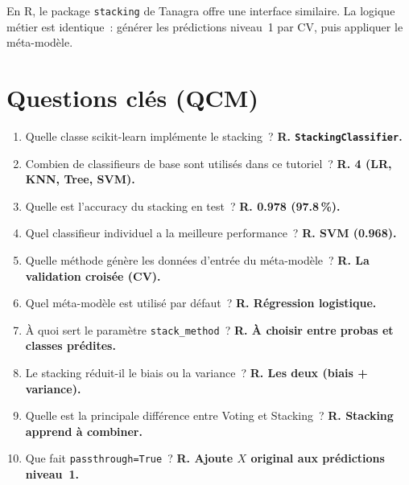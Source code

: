 \documentclass[a4paper,11pt]{article}
\begin{document}
\noindent En R, le package \texttt{stacking} de Tanagra offre une
interface similaire. La logique m\'etier est identique~: g\'en\'erer
les pr\'edictions niveau~1 par CV, puis appliquer le m\'eta-mod\`ele.

\newpage
\section*{Questions cl\'es (QCM)}

\begin{enumerate}
  \item Quelle classe scikit-learn impl\'emente le stacking~?
    \textbf{R. \texttt{StackingClassifier}.}
  \item Combien de classifieurs de base sont utilis\'es dans ce
    tutoriel~? \textbf{R. 4 (LR, KNN, Tree, SVM).}
  \item Quelle est l'accuracy du stacking en test~?
    \textbf{R. 0.978 (97.8\,\%).}
  \item Quel classifieur individuel a la meilleure performance~?
    \textbf{R. SVM (0.968).}
  \item Quelle m\'ethode g\'en\`ere les donn\'ees d'entr\'ee du
    m\'eta-mod\`ele~? \textbf{R. La validation crois\'ee (CV).}
  \item Quel m\'eta-mod\`ele est utilis\'e par d\'efaut~?
    \textbf{R. R\'egression logistique.}
  \item \`A quoi sert le param\`etre \texttt{stack\_method}~?
    \textbf{R. \`A choisir entre probas et classes pr\'edites.}
  \item Le stacking r\'eduit-il le biais ou la variance~?
    \textbf{R. Les deux (biais + variance).}
  \item Quelle est la principale diff\'erence entre Voting et
    Stacking~? \textbf{R. Stacking apprend \`a combiner.}
  \item Que fait \texttt{passthrough=True}~?
    \textbf{R. Ajoute $X$ original aux pr\'edictions niveau~1.}
\end{enumerate}

\vfill
\end{document}
